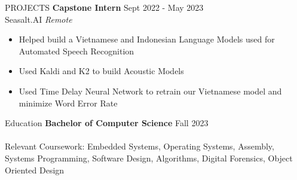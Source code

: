 \documentclass{resume} %
\begin{document}
	\begin{rSection}{PROJECTS}
		\textbf{Capstone Intern} \hfill Sept 2022 - May 2023 \\
		Seasalt.AI \hfill \textit{Remote}
		\begin{itemize} \itemsep -5pt {} 
			\item Helped build a Vietnamese and Indonesian Language Models used for Automated Speech Recognition
			\item Used Kaldi and K2 to build Acoustic Models
			\item Used Time Delay Neural Network to retrain our Vietnamese model and minimize Word Error Rate
		\end{itemize}


	\end{rSection} 


	\begin{rSection}{Education}
		{\bf Bachelor of Computer Science} \hfill {Fall 2023} \\
		\\
		Relevant Coursework: Embedded Systems, Operating Systems, Assembly, Systems Programming, Software Design, Algorithms, Digital Forensics, Object Oriented Design
	\end{rSection}

	\vfill
	\begin{center}
	\end{center}
\end{document}
